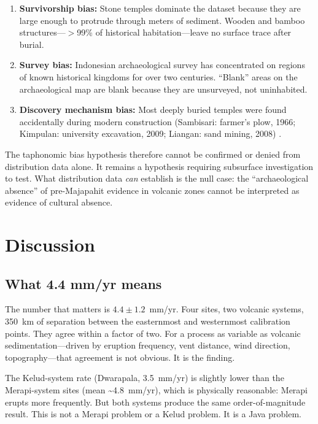 \documentclass[12pt,a4paper]{article}
\begin{document}
\begin{enumerate}
  \item \textbf{Survivorship bias:} Stone temples dominate the dataset because they are large enough to protrude through meters of sediment. Wooden and bamboo structures---$>$99\% of historical habitation---leave no surface trace after burial.
  \item \textbf{Survey bias:} Indonesian archaeological survey has concentrated on regions of known historical kingdoms for over two centuries. ``Blank'' areas on the archaeological map are blank because they are unsurveyed, not uninhabited.
  \item \textbf{Discovery mechanism bias:} Most deeply buried temples were found accidentally during modern construction (Sambisari: farmer's plow, 1966; Kimpulan: university excavation, 2009; Liangan: sand mining, 2008) \citep{putra2019,abbas2016}.
\end{enumerate}

The taphonomic bias hypothesis therefore cannot be confirmed or denied from distribution data alone. It remains a hypothesis requiring subsurface investigation to test. What distribution data \textit{can} establish is the null case: the ``archaeological absence'' of pre-Majapahit evidence in volcanic zones cannot be interpreted as evidence of cultural absence.

\section{Discussion}

\subsection{What 4.4 mm/yr means}

The number that matters is $4.4 \pm 1.2$~mm/yr. Four sites, two volcanic systems, 350~km of separation between the easternmost and westernmost calibration points. They agree within a factor of two. For a process as variable as volcanic sedimentation---driven by eruption frequency, vent distance, wind direction, topography---that agreement is not obvious. It is the finding.

The Kelud-system rate (Dwarapala, 3.5~mm/yr) is slightly lower than the Merapi-system sites (mean \textasciitilde4.8~mm/yr), which is physically reasonable: Merapi erupts more frequently. But both systems produce the same order-of-magnitude result. This is not a Merapi problem or a Kelud problem. It is a Java problem.
\end{document}
